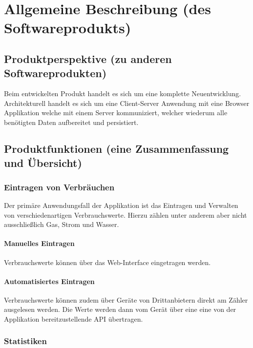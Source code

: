 \section{Allgemeine Beschreibung (des Softwareprodukts)}


\subsection{Produktperspektive (zu anderen Softwareprodukten)}


Beim entwickelten Produkt handelt es sich um eine komplette Neuentwicklung. Architekturell handelt es sich um eine Client-Server Anwendung mit eine Browser Applikation welche mit einem Server kommuniziert, welcher wiederum alle benötigten Daten aufbereitet und persistiert.

\subsection{Produktfunktionen (eine Zusammenfassung und Übersicht)}

\subsubsection{Eintragen von Verbräuchen}

Der primäre Anwendungsfall der Applikation ist das Eintragen und Verwalten von verschiedenartigen Verbrauchswerte. Hierzu zählen unter anderem aber nicht ausschließlich Gas, Strom und Wasser. 

\paragraph{Manuelles Eintragen}

    Verbrauchswerte können über das Web-Interface eingetragen werden.

\paragraph{Automatisiertes Eintragen}
\label{autom_eintragen}

    Verbrauchswerte können zudem über Geräte von Drittanbietern direkt am Zähler ausgelesen werden. Die Werte werden dann vom Gerät über eine eine von der Applikation bereitzustellende API übertragen.

\subsubsection{Statistiken}

